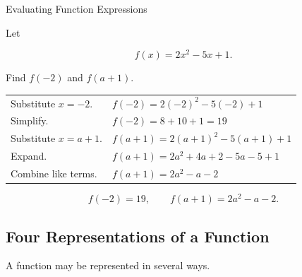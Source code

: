 \begin{workedexamplebox}{Evaluating Function Expressions}

Let

\[ f(x)=2x^2-5x+1. \]

Find \(f(-2)\) and \(f(a+1)\).

\begin{tabularx}{\textwidth}{@{}>{\raggedright\arraybackslash}p{}X@{}}
Substitute \(x=-2\). &
\(f(-2)=2(-2)^2-5(-2)+1\)\\
Simplify. &
\(f(-2)=8+10+1=19\)\\[2mm]
Substitute \(x=a+1\). &
\(f(a+1)=2(a+1)^2-5(a+1)+1\)\\
Expand. &
\(f(a+1)=2a^2+4a+2-5a-5+1\)\\
Combine like terms. &
\(f(a+1)=2a^2-a-2\)
\end{tabularx}

\begin{answerbox}
\[ \boxed{f(-2)=19,\qquad f(a+1)=2a^2-a-2.} \]
\end{answerbox}
\end{workedexamplebox}

\subsection{Four Representations of a Function}
\label{subsec:function-representations}

A function may be represented in several ways.

\begin{center}
\end{center}

